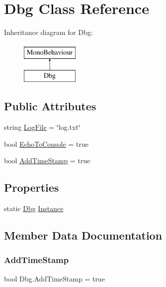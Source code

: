 \hypertarget{classDbg}{}\section{Dbg Class Reference}
\label{classDbg}
Inheritance diagram for Dbg\+:\begin{figure}[H]
\begin{center}
\leavevmode
\includegraphics[height=2.000000cm]{classDbg}
\end{center}
\end{figure}
\subsection*{Public Attributes}
\begin{DoxyCompactItemize}
\item 
string \hyperlink{classDbg_a1882a17eb1d1e854e51ae7102ffe798c}{Log\+File} = \char`\"{}log.\+txt\char`\"{}
\item 
bool \hyperlink{classDbg_a320be8a5d39f4ceb8b8a36d06a671113}{Echo\+To\+Console} = true
\item 
bool \hyperlink{classDbg_a97fe9e972caa71b852d4a76d6fac09e6}{Add\+Time\+Stamp} = true
\end{DoxyCompactItemize}
\subsection*{Properties}
\begin{DoxyCompactItemize}
\item 
static \hyperlink{classDbg}{Dbg} \hyperlink{classDbg_a2e3e8eb911bd79c9185e8bcec17f365f}{Instance}
\end{DoxyCompactItemize}


\subsection{Member Data Documentation}
\mbox{\label{classDbg_a97fe9e972caa71b852d4a76d6fac09e6}} 
\subsubsection{\texorpdfstring{Add\+Time\+Stamp}{AddTimeStamp}}
{\footnotesize\ttfamily bool Dbg.\+Add\+Time\+Stamp = true}

